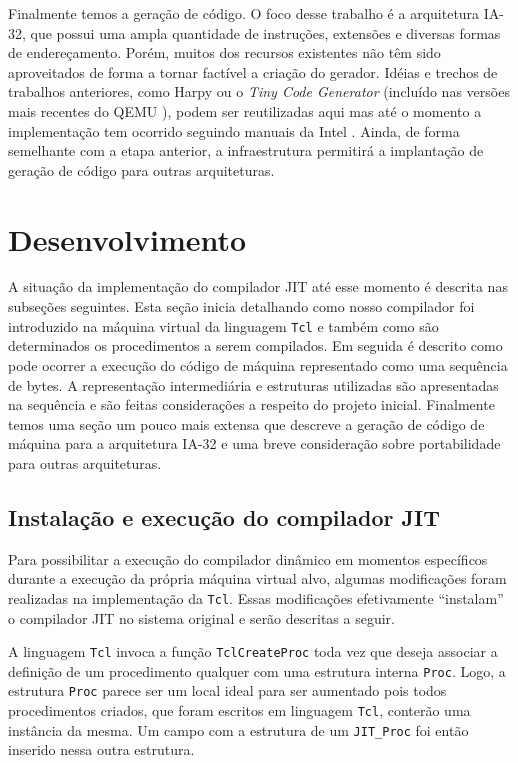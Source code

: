 Finalmente temos a geração de código. O foco desse trabalho é a
arquitetura IA-32, que possui uma ampla quantidade de instruções, extensões e
diversas formas de endereçamento.
Porém, muitos dos recursos existentes não têm sido aproveitados de
forma a tornar factível a criação do gerador.
Idéias e trechos de trabalhos anteriores, como Harpy \cite{harpy}
ou o \textit{Tiny Code Generator} (incluído nas versões mais recentes do
QEMU \cite{qemu}), podem ser reutilizadas aqui mas até o momento a
implementação tem ocorrido seguindo manuais da Intel
\cite{intel_aam}\cite{intel_naz}. Ainda, de forma semelhante com a
etapa anterior, a infraestrutura permitirá a implantação de geração de
código para outras arquiteturas.


\section{Desenvolvimento}
\label{desenvolvimento}

A situação da implementação do compilador JIT até esse momento é descrita nas
subseções seguintes. Esta seção inicia detalhando como nosso
compilador foi introduzido na máquina virtual da linguagem \texttt{Tcl} e
também como são determinados os procedimentos a serem compilados. Em
seguida é descrito como pode ocorrer a execução do código de máquina
representado como uma sequência de bytes. A representação
intermediária e estruturas utilizadas são apresentadas na sequência e
são feitas considerações a respeito do projeto inicial. Finalmente
temos uma seção um pouco mais extensa que descreve a geração de código
de máquina para a arquitetura IA-32 e uma breve consideração sobre
portabilidade para outras arquiteturas.


\subsection{Instalação e execução do compilador JIT}
\label{install-exec}
Para possibilitar a execução do compilador dinâmico em momentos
específicos durante a execução da própria máquina virtual alvo, algumas
modificações foram realizadas na implementação da
\texttt{Tcl}. Essas modificações efetivamente ``instalam'' o
compilador JIT no sistema original e serão descritas a seguir.

A linguagem \texttt{Tcl} invoca a função \verb!TclCreateProc! toda vez
que deseja associar a definição de um procedimento qualquer com uma
estrutura interna \verb!Proc!. Logo, a estrutura \verb!Proc! parece
ser um local ideal para ser aumentado pois todos procedimentos
criados, que foram escritos em linguagem \texttt{Tcl}, conterão uma
instância da mesma. Um campo com a estrutura de um
\verb!JIT_Proc! foi então inserido nessa outra estrutura.

